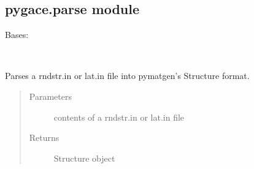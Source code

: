 \documentclass[letterpaper,10pt,english]{sphinxmanual}
\begin{document}
\subsection{pygace.parse module}
\label{\detokenize{pygace:module-pygace.parse}}\label{\detokenize{pygace:pygace-parse-module}}

\begin{fulllineitems}
\label{\detokenize{pygace:pygace.parse.GaceMcsqs}}
\sphinxAtStartPar
Bases: 

\begin{fulllineitems}
\label{\detokenize{pygace:pygace.parse.GaceMcsqs.nb_occu_sites}}~
\end{fulllineitems}


\begin{fulllineitems}
\label{\detokenize{pygace:pygace.parse.GaceMcsqs.structure_from_string}}
\sphinxAtStartPar
Parses a rndstr.in or lat.in file into pymatgen’s
Structure format.
\begin{quote}\begin{description}
\item[{Parameters}] \leavevmode
\sphinxAtStartPar
{} \textendash{} contents of a rndstr.in or lat.in file

\item[{Returns}] \leavevmode
\sphinxAtStartPar
Structure object

\end{description}\end{quote}


\end{fulllineitems}
\end{fulllineitems}
\end{document}
